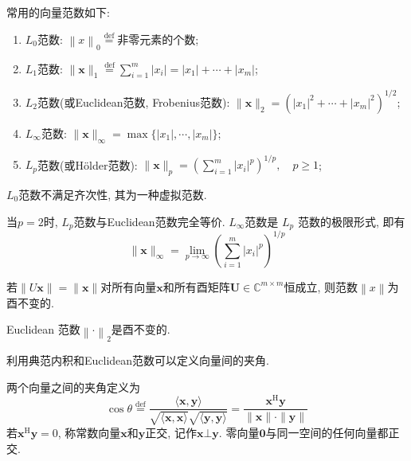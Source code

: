 \documentclass[lang=cn,10pt]{gorgeousnbook}
\numberwithin{equation}{section}%
\numberwithin{figure}{section}%
\begin{document}
常用的向量范数如下:
\begin{enumerate}[(1)]
\item $L_0$范数: $\left\|x\right\|_0\overset{\mathrm{def}}{\operatorname*{=}}\text{非零元素的个数}$;
\item $L_1$范数: $\|\boldsymbol{x}\|_1\overset{\mathrm{def}}{\operatorname*{=}}\sum_{i=1}^m|x_i|=|x_1|+\cdots+|x_m|$;
\item $L_2$范数(或Euclidean范数, Frobenius范数): $\|\boldsymbol{x}\|_2=\left(|x_1|^2+\cdots+|x_m|^2\right)^{1/2}$;
\item $L_{\infty}$范数: $\|\boldsymbol{x}\|_\infty=\max\{|x_1|,\cdots,|x_m|\}$;
\item $L_p$范数(或Hölder范数): $\|\boldsymbol{x}\|_p=\left(\sum_{i=1}^m|x_i|^p\right)^{1/p},\quad p\geqslant1$;
\end{enumerate}
\begin{note}
$L_0$范数不满足齐次性, 其为一种虚拟范数.
\end{note}
\begin{note}
当$p=2$时, $L_p$范数与Euclidean范数完全等价. $L_{\infty}$范数是 $L_p$ 范数的极限形式, 即有 
\begin{equation}
\|\boldsymbol{x}\|_\infty=\lim_{p\to\infty}\left(\sum_{i=1}^m|x_i|^p\right)^{1/p}
\end{equation}
\end{note}
\begin{note}
若$\|U\boldsymbol{x}\|=\|\boldsymbol{x}\|$对所有向量$\bm{x}$和所有酉矩阵$\bm{U}\in \mathbb{C}^{m\times m}$恒成立, 则范数$\left\|x\right\|$为酉不变的. 
\end{note}
\begin{proposition}
Euclidean 范数$\left\|\cdot\right\|_2$是酉不变的.
\end{proposition}
利用典范内积和Euclidean范数可以定义向量间的夹角. 
\begin{definition}
两个向量之间的夹角定义为
\begin{equation}
\cos\theta\stackrel{\mathrm{def}}{=}\frac{\langle\boldsymbol{x},\boldsymbol{y}\rangle}{\sqrt{\langle\boldsymbol{x},\boldsymbol{x}\rangle}\sqrt{\langle\boldsymbol{y},\boldsymbol{y}\rangle}}=\frac{\boldsymbol{x}^\mathrm{H}\boldsymbol{y}}{\|\boldsymbol{x}\|\cdot\|\boldsymbol{y}\|}
\end{equation}
若$\bm{x}^\text{H}\bm{y}=0$, 称常数向量$\bm{x}$和$\bm{y}$正交, 记作$\bm{x}\bot \bm{y}$. 零向量$\bm{0}$与同一空间的任何向量都正交. 
\end{definition}
\end{document}
